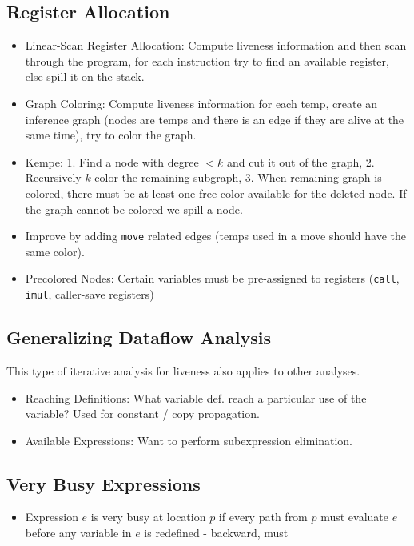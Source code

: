 \subsection*{Register Allocation}
\begin{itemize}
	\item Linear-Scan Register Allocation: Compute liveness information and then scan through the program, for each instruction try to find an available register, else spill it on the stack.
	
	\item Graph Coloring: Compute liveness information for each temp, create an inference graph (nodes are temps and there is an edge if they are alive at the same time), try to color the graph.
	
	\item Kempe: 1. Find a node with degree $< k$ and cut it out of the graph, 2. Recursively $k$-color the remaining subgraph, 3. When remaining graph is colored, there must be at least one free color available for the deleted node. If the graph cannot be colored we spill a node.
	\item Improve by adding \texttt{move} related edges (temps used in a move should have the same color).
	
	\item Precolored Nodes: Certain variables must be pre-assigned to registers (\texttt{call}, \texttt{imul}, caller-save registers)
\end{itemize}


\subsection*{Generalizing Dataflow Analysis}
This type of iterative analysis for liveness also applies to other analyses.

\begin{itemize}
	\item Reaching Definitions: What variable def. reach a particular use of the variable? Used for constant / copy propagation.
	\item Available Expressions: Want to perform subexpression elimination.
\end{itemize}


\subsection*{Very Busy Expressions}
\begin{itemize}
	\item Expression $e$ is very busy at location $p$ if every path from $p$ must evaluate $e$ before any variable in $e$ is redefined - backward, must
\end{itemize}


